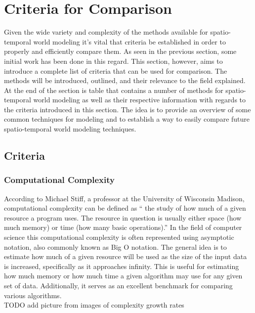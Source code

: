 
  \chapter{Criteria for Comparison}

  Given the wide variety and complexity of the methods available for
  spatio-temporal world modeling it's vital that criteria be established in
  order to properly and efficiently compare them. As seen in the previous
  section, some initial work has been done in this regard. This section,
  however, aims to introduce a complete list of criteria that can be used
  for comparison. The methods will be introduced, outlined, and their relevance
  to the field explained. At the end of the section is table that contains
  a number of methods for spatio-temporal world modeling as well as their
  respective information with regards to the criteria introduced in this section.
  The idea is to provide an overview of some common techniques for modeling
  and to establish a way to easily compare future spatio-temporal world modeling
  techniques.


  \section{ Criteria }

  \subsection{ Computational Complexity }
  According to Michael Stiff, a professor at the University of Wisconsin
  Madison, computational complexity can be defined as `` the study of how much
  of a given resource a program uses. The resource in question is usually
  either space (how much memory) or time (how many basic operations).''
  \cite{ComplexityUW} In the field of computer science this computational
  complexity is often represented using asymptotic notation, also commonly
  known as Big O notation. The general idea is to estimate how much of a given
  resource will be used as the size of the input data is increased, specifically
  as it approaches infinity. This is useful for estimating how much memory or
  how much time a given algorithm may use for any given set of data.
  Additionally, it serves as an excellent benchmark for comparing various
  algorithms.\\

  TODO add picture from images of complexity growth rates

